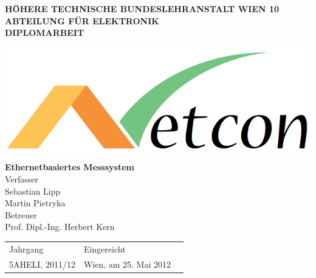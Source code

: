 \documentclass[a4paper,14pt,headsepline]{scrartcl}
\begin{document}
\begin{titlepage}
    \begin{center}

\begin{center}
\textbf{HÖHERE TECHNISCHE BUNDESLEHRANSTALT WIEN 10 ABTEILUNG FÜR ELEKTRONIK}\\
 \vspace{2cm}
\LARGE\textbf{\textsc{DIPLOMARBEIT}}\\
     \vspace{2cm}
     
     
\includegraphics[width=0.35 \paperwidth]{./bilder/logo.png} \\
 \huge \textbf{\textsf{Ethernetbasiertes Messsystem}} \\
\vspace{1cm}
Verfasser \\
\vspace{0.5cm}
 \normalsize Sebastian Lipp \\
 Martin Pietryka \\
  
\vspace{1cm}
\huge Betreuer \\
\vspace{0.5cm}
 \normalsize Prof. Dipl.-Ing. Herbert Kern \\
 
 \end{center}
 
 \vspace{2cm}
 
\huge
 \begin{tabular}{L{5cm}R{10cm}l}
 
    	Jahrgang         & {Eingereicht} \\
	\normalsize
    	5AHELI, 2011/12 & {\normalsize Wien, am 25. Mai 2012} \\

\end{tabular}\\
  
\end{center}

\end{titlepage}
\end{document}
